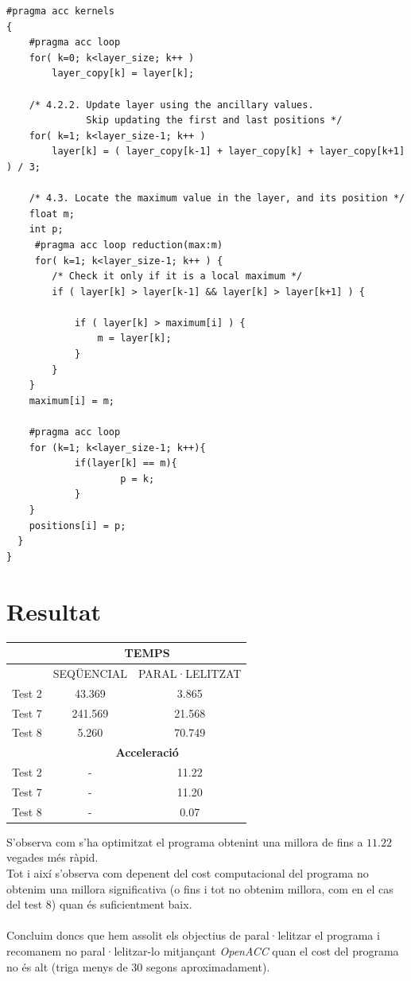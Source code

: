 \documentclass[a4paper, 11pt]{article}
\begin{document}
\begin{lstlisting}[language = GERONA, firstnumber = 212]
#pragma acc kernels
{
    #pragma acc loop    
    for( k=0; k<layer_size; k++ )
        layer_copy[k] = layer[k];

    /* 4.2.2. Update layer using the ancillary values.
              Skip updating the first and last positions */
    for( k=1; k<layer_size-1; k++ )
        layer[k] = ( layer_copy[k-1] + layer_copy[k] + layer_copy[k+1] ) / 3;

    /* 4.3. Locate the maximum value in the layer, and its position */
    float m;
    int p;
     #pragma acc loop reduction(max:m)        
     for( k=1; k<layer_size-1; k++ ) {
        /* Check it only if it is a local maximum */
        if ( layer[k] > layer[k-1] && layer[k] > layer[k+1] ) {

            if ( layer[k] > maximum[i] ) {
                m = layer[k];
            }
        }
    }
    maximum[i] = m;
    
    #pragma acc loop 
    for (k=1; k<layer_size-1; k++){
            if(layer[k] == m){
                    p = k;
            }
    }
    positions[i] = p;
  }
}
\end{lstlisting}
\newpage
\section{Resultat}
\begin{table}[h]
  \centering
  \begin{tabular}{l||c||c}
        \multirow{3}{*}{\cellcolor{black}{}} & \multicolumn{2}{c}{\textbf{TEMPS}}\\\hline
        \cellcolor{black}{} &  SEQÜENCIAL & PARAL·LELITZAT\\ \hline\hline
        Test 2 & 43.369 & 3.865  \\\hline
        Test 7 & 241.569 & 21.568 \\\hline
        Test 8 & 5.260 & 70.749 \\\hline\hline
        \cellcolor{black}{} & \multicolumn{2}{c}{\textbf{Acceleració}} \\\hline\hline
        Test 2 & - & 11.22  \\\hline
        Test 7 & - & 11.20 \\\hline
        Test 8 & - & 0.07 \\
    \end{tabular}
\end{table}
\hspace{-1.5 em}S'observa com s'ha optimitzat el programa obtenint una millora de fins a $11.22$ vegades més ràpid.\\
Tot i així s'observa com depenent del cost computacional del programa no obtenim una millora significativa (o fins i tot no obtenim millora, com en el cas del test 8) quan és suficientment baix. \\\\
Concluim doncs que hem assolit els objectius de paral·lelitzar el programa i recomanem no paral·lelitzar-lo mitjançant \textit{OpenACC} quan el cost del programa no és alt (triga menys de 30 segons aproximadament).
\newpage
\end{document}
